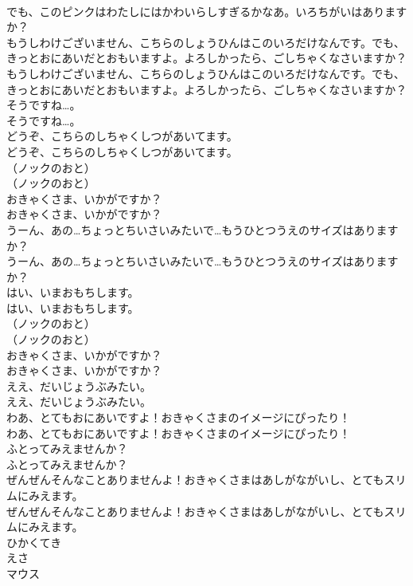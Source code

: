 \documentclass[8pt]{extreport}
\begin{document}
\begin{CJK}{UTF8}{min}
\\	でも、このピンクはわたしにはかわいらしすぎるかなあ。いろちがいはありますか？ 
\\	もうしわけございません、こちらのしょうひんはこのいろだけなんです。でも、きっとおにあいだとおもいますよ。よろしかったら、ごしちゃくなさいますか？	
\\	もうしわけございません、こちらのしょうひんはこのいろだけなんです。でも、きっとおにあいだとおもいますよ。よろしかったら、ごしちゃくなさいますか？ 
\\	そうですね…。	
\\	そうですね…。 
\\	どうぞ、こちらのしちゃくしつがあいてます。	
\\	どうぞ、こちらのしちゃくしつがあいてます。 
\\	（ノックのおと）	
\\	（ノックのおと） 
\\	おきゃくさま、いかがですか？	
\\	おきゃくさま、いかがですか？ 
\\	うーん、あの…ちょっとちいさいみたいで…もうひとつうえのサイズはありますか？	
\\	うーん、あの…ちょっとちいさいみたいで…もうひとつうえのサイズはありますか？ 
\\	はい、いまおもちします。	
\\	はい、いまおもちします。 
\\	（ノックのおと）	
\\	（ノックのおと） 
\\	おきゃくさま、いかがですか？	
\\	おきゃくさま、いかがですか？ 
\\	ええ、だいじょうぶみたい。	
\\	ええ、だいじょうぶみたい。 
\\	わあ、とてもおにあいですよ！おきゃくさまのイメージにぴったり！	
\\	わあ、とてもおにあいですよ！おきゃくさまのイメージにぴったり！ 
\\	ふとってみえませんか？	
\\	ふとってみえませんか？ 
\\	ぜんぜんそんなことありませんよ！おきゃくさまはあしがながいし、とてもスリムにみえます。	
\\	ぜんぜんそんなことありませんよ！おきゃくさまはあしがながいし、とてもスリムにみえます。 
\\	ひかくてき
\\	えさ
\\	マウス

\end{CJK}
\end{document}
